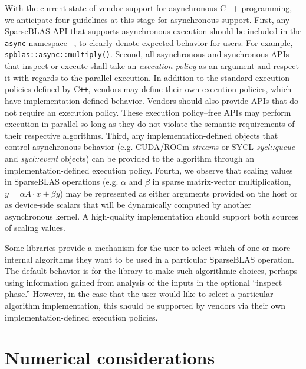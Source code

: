 \documentclass[manuscript,review]{acmart}
\newcommand{\cplusplus}{C\texttt{++}\xspace}
\begin{document}
With the current state of vendor support for asynchronous C++ programming, we anticipate four guidelines at this stage for asynchronous support.
First, any SparseBLAS API that supports asynchronous execution should be included in the \verb|async| namespace ~\cite{p3300r0}, to clearly denote expected behavior for users. For example, \verb|spblas::async::multiply()|.
Second, all asynchronous and synchronous APIs that inspect or execute shall take an \textit{execution policy} as an argument and respect it with regards to the parallel execution. In addition to the standard execution policies defined by \cplusplus, vendors may define their own execution policies, which have implementation-defined behavior. Vendors should also provide APIs that do not require an execution policy. These execution policy--free APIs may perform execution in parallel so long as they do not violate the semantic requirements of their respective algorithms.
Third, any implementation-defined objects that control asynchronous behavior (e.g. CUDA/ROCm \textit{stream}s or SYCL \textit{sycl::queue} and \textit{sycl::event} objects) can be provided to the algorithm through an implementation-defined execution policy.
Fourth, we observe that scaling values in SparseBLAS operations (e.g. $\alpha$ and $\beta$ in sparse matrix-vector multiplication, $y = \alpha A\cdot x + \beta y$) may be represented as either arguments provided on the host or as device-side scalars that will be dynamically computed by another asynchronous kernel. A high-quality implementation should support both sources of scaling values.

Some libraries provide a mechanism for the user to select which of one or more internal algorithms they want to be used in a particular SparseBLAS operation. The default behavior is for the library to make such algorithmic choices, perhaps using information gained from analysis of the inputs in the optional ``inspect phase.'' However, in the case that the user would like to select a particular algorithm implementation, this should be supported by vendors via their own implementation-defined execution policies.




\section{Numerical considerations}
\end{document}
